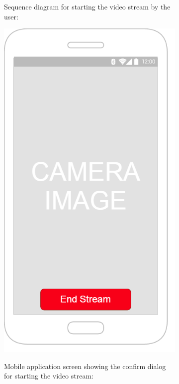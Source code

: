 \documentclass{article}
\begin{document}
\begin{figure}
\begin{subfigure}{.5\textwidth}
  Sequence diagram for starting the video stream by the user:
\end{subfigure}%
\begin{subfigure}{.5\textwidth}
  \centering
  \includegraphics[width=.9\linewidth]{"VideoStream/7"}
	
	Mobile application screen showing the confirm dialog for starting the video stream:
\end{subfigure}
\end{figure}
	
\end{document}
